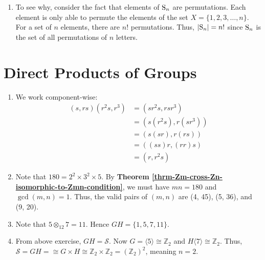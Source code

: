 \begin{enumerate}
    \item To see why, consider the fact that elements of $\mathrm{S}_{n}$ are permutations. Each element is only able to permute the elements of the set $X = \{1, 2, 3, \dots, n\}$. For a set of $n$ elements, there are $n!$ permutations. Thus, $|\mathrm{S}_{n}| = n!$ since $\mathrm{S}_{n}$ is the set of all permutations of $n$ letters.
\end{enumerate}

\section{Direct Products of Groups}
\begin{enumerate}
    \item We work component-wise:
    \begin{align*}
        (s, rs)(r^2s, r^3) &= (sr^2s, rsr^3)\\
        &= (s(r^2s), r(sr^3))\\
        &= (s(sr), r(rs))\\
        &= ((ss)r, (rr)s)\\
        &= (r, r^2s)
    \end{align*}

    \item Note that $180 = 2^2 \times 3^2 \times 5$. By \textbf{Theorem \ref{thrm-Zm-cross-Zn-isomorphic-to-Zmn-condition}}, we must have $mn = 180$ and $\gcd(m, n) = 1$. Thus, the valid pairs of $(m,n)$ are (4, 45), (5, 36), and (9, 20).

    \item Note that $5 \otimes_{12} 7 = 11$. Hence $GH = \{1, 5, 7, 11\}$.

    \item From above exercise, $GH = \mathcal{S}$. Now $G = \langle 5 \rangle \cong \mathbb{Z}_2$ and $H \langle 7 \rangle \cong \mathbb{Z}_2$. Thus, $\mathcal{S} = GH = \cong G \times H \cong \mathbb{Z}_2 \times \mathbb{Z}_2 = (\mathbb{Z}_2)^2$, meaning $n = 2$.
\end{enumerate}

